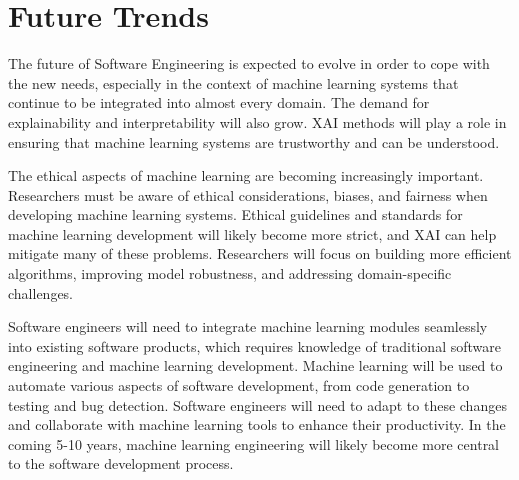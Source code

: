 \documentclass{article}
\begin{document}
\section{Future Trends}

The future of Software Engineering is expected to evolve in order to cope with the new needs, especially in the context of machine learning systems that continue to be integrated into almost every domain.
The demand for explainability and interpretability will also grow. XAI methods will play a role in ensuring that machine learning systems are trustworthy and can be understood. 

The ethical aspects of machine learning are becoming increasingly important. Researchers must be aware of ethical considerations, biases, and fairness when developing machine learning systems. Ethical guidelines and standards for machine learning development will likely become more strict, and XAI can help mitigate many of these problems. 
Researchers will focus on building more efficient algorithms, improving model robustness, and addressing domain-specific challenges.

Software engineers will need to integrate machine learning modules seamlessly into existing software products, which requires knowledge of traditional software engineering and machine learning development.
Machine learning will be used to automate various aspects of software development, from code generation to testing and bug detection. Software engineers will need to adapt to these changes and collaborate with machine learning tools to enhance their productivity. In the coming 5-10 years, machine learning engineering will likely become more central to the software development process.

\printbibliography
\end{document}
